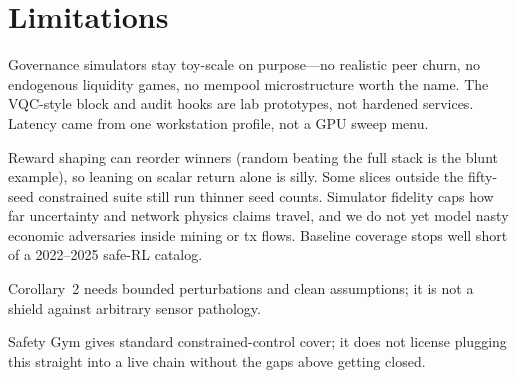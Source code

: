 \section{Limitations}

Governance simulators stay toy-scale on purpose---no realistic peer churn, no endogenous liquidity games, no mempool microstructure worth the name. The VQC-style block and audit hooks are lab prototypes, not hardened services. Latency came from one workstation profile, not a GPU sweep menu.

Reward shaping can reorder winners (random beating the full stack is the blunt example), so leaning on scalar return alone is silly. Some slices outside the fifty-seed constrained suite still run thinner seed counts. Simulator fidelity caps how far uncertainty and network physics claims travel, and we do not yet model nasty economic adversaries inside mining or tx flows. Baseline coverage stops well short of a 2022--2025 safe-RL catalog.

Corollary~2 needs bounded perturbations and clean assumptions; it is not a shield against arbitrary sensor pathology.

Safety Gym gives standard constrained-control cover; it does not license plugging this straight into a live chain without the gaps above getting closed.
